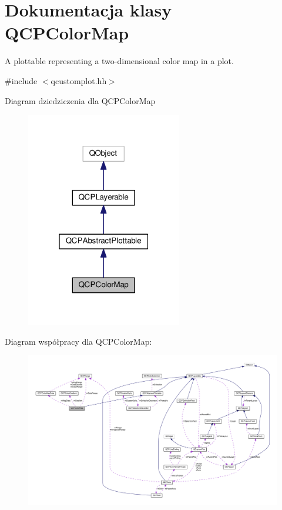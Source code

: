 \hypertarget{class_q_c_p_color_map}{}\section{Dokumentacja klasy Q\+C\+P\+Color\+Map}
\label{class_q_c_p_color_map}


A plottable representing a two-\/dimensional color map in a plot.  




{\ttfamily \#include $<$qcustomplot.\+hh$>$}



Diagram dziedziczenia dla Q\+C\+P\+Color\+Map\nopagebreak
\begin{figure}[H]
\begin{center}
\leavevmode
\includegraphics[width=193pt]{class_q_c_p_color_map__inherit__graph}
\end{center}
\end{figure}


Diagram współpracy dla Q\+C\+P\+Color\+Map\+:\nopagebreak
\begin{figure}[H]
\begin{center}
\leavevmode
\includegraphics[width=350pt]{class_q_c_p_color_map__coll__graph}
\end{center}
\end{figure}
